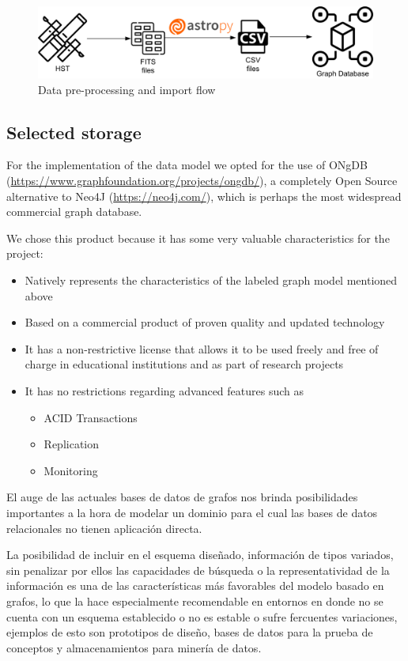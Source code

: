 	\begin{figure}[h]
		\includegraphics[width=\linewidth]{./images/importacion-datos}
		\caption{Data pre-processing and import flow}
		\label{fig:import-data-eng}
	\end{figure}

	\subsection{Selected storage}
	
	For the implementation of the data model we opted for the use of ONgDB (\url{https://www.graphfoundation.org/projects/ongdb/}), a completely Open Source alternative to Neo4J (\url{https://neo4j.com/}), which is perhaps the most widespread commercial graph database.
	
	We chose this product because it has some very valuable characteristics for the project:
	
	\begin{itemize}
		\item Natively represents the characteristics of the labeled graph model mentioned above
		\item Based on a commercial product of proven quality and updated technology
		\item It has a non-restrictive license that allows it to be used freely and free of charge in educational institutions and as part of research projects
		\item It has no restrictions regarding advanced features such as
		\begin{itemize}
			\item ACID Transactions
			\item Replication
			\item Monitoring
		\end{itemize}
	\end{itemize}
\else
	El auge de las actuales bases de datos de grafos nos brinda posibilidades importantes a la hora de modelar un dominio para el cual las bases de datos relacionales no tienen aplicación directa.
	
	La posibilidad de incluir en el esquema diseñado, información de tipos variados, sin penalizar por ellos las capacidades de búsqueda o la representatividad de la información es una de las características más favorables del modelo basado en grafos, lo que la hace especialmente recomendable en entornos en donde no se cuenta con un esquema establecido o no es estable o sufre fercuentes variaciones, ejemplos de esto son prototipos de diseño, bases de datos para la prueba de conceptos y almacenamientos para minería de datos\cite{robinson2015graph}.
	
